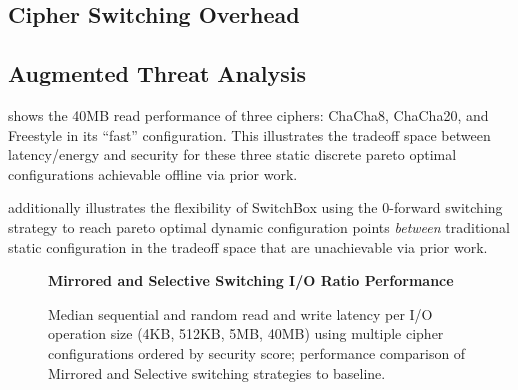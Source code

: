 
\subsection{Cipher Switching Overhead}


\subsection{Augmented Threat Analysis}





 shows the 40MB read performance of three ciphers:
ChaCha8, ChaCha20, and Freestyle in its ``fast'' configuration. This illustrates
the tradeoff space between latency/energy and security for these three static
discrete pareto optimal configurations achievable offline via prior work.

 additionally illustrates the flexibility of
SwitchBox using the 0-forward switching strategy to reach pareto optimal dynamic
configuration points \emph{between} traditional static configuration in the
tradeoff space that are unachievable via prior work.

\begin{figure*}[ht]
   \textbf{Mirrored and Selective Switching I/O Ratio Performance}\par\medskip
   \centering
   {} \caption{Median sequential
   and random read and write latency per I/O operation size (4KB, 512KB, 5MB,
   40MB) using multiple cipher configurations ordered by security score;
   performance comparison of Mirrored and Selective switching strategies to
   baseline.}
  \label{fig:mirrored-selective-baseline}
\end{figure*}


